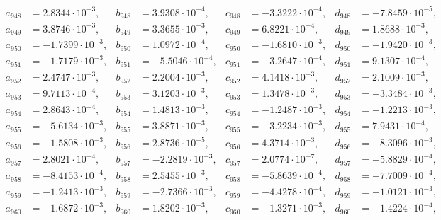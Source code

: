 \begin{align*}
  a_{ 948 } &= 2.8344 \cdot 10^{ -3 }, & b_{ 948 } &= 3.9308 \cdot 10^{ -4 }, & c_{ 948 } &= -3.3222 \cdot 10^{ -4 }, & d_{ 948 } &= -7.8459 \cdot 10^{ -5 }, \\ 
  a_{ 949 } &= 3.8746 \cdot 10^{ -3 }, & b_{ 949 } &= 3.3655 \cdot 10^{ -3 }, & c_{ 949 } &= 6.8221 \cdot 10^{ -4 }, & d_{ 949 } &= 1.8688 \cdot 10^{ -3 }, \\ 
  a_{ 950 } &= -1.7399 \cdot 10^{ -3 }, & b_{ 950 } &= 1.0972 \cdot 10^{ -4 }, & c_{ 950 } &= -1.6810 \cdot 10^{ -3 }, & d_{ 950 } &= -1.9420 \cdot 10^{ -3 }, \\ 
  a_{ 951 } &= -1.7179 \cdot 10^{ -3 }, & b_{ 951 } &= -5.5046 \cdot 10^{ -4 }, & c_{ 951 } &= -3.2647 \cdot 10^{ -4 }, & d_{ 951 } &= 9.1307 \cdot 10^{ -4 }, \\ 
  a_{ 952 } &= 2.4747 \cdot 10^{ -3 }, & b_{ 952 } &= 2.2004 \cdot 10^{ -3 }, & c_{ 952 } &= 4.1418 \cdot 10^{ -3 }, & d_{ 952 } &= 2.1009 \cdot 10^{ -3 }, \\ 
  a_{ 953 } &= 9.7113 \cdot 10^{ -4 }, & b_{ 953 } &= 3.1203 \cdot 10^{ -3 }, & c_{ 953 } &= 1.3478 \cdot 10^{ -3 }, & d_{ 953 } &= -3.3484 \cdot 10^{ -3 }, \\ 
  a_{ 954 } &= 2.8643 \cdot 10^{ -4 }, & b_{ 954 } &= 1.4813 \cdot 10^{ -3 }, & c_{ 954 } &= -1.2487 \cdot 10^{ -3 }, & d_{ 954 } &= -1.2213 \cdot 10^{ -3 }, \\ 
  a_{ 955 } &= -5.6134 \cdot 10^{ -3 }, & b_{ 955 } &= 3.8871 \cdot 10^{ -3 }, & c_{ 955 } &= -3.2234 \cdot 10^{ -3 }, & d_{ 955 } &= 7.9431 \cdot 10^{ -4 }, \\ 
  a_{ 956 } &= -1.5808 \cdot 10^{ -3 }, & b_{ 956 } &= 2.8736 \cdot 10^{ -5 }, & c_{ 956 } &= 4.3714 \cdot 10^{ -3 }, & d_{ 956 } &= -8.3096 \cdot 10^{ -3 }, \\ 
  a_{ 957 } &= 2.8021 \cdot 10^{ -4 }, & b_{ 957 } &= -2.2819 \cdot 10^{ -3 }, & c_{ 957 } &= 2.0774 \cdot 10^{ -7 }, & d_{ 957 } &= -5.8829 \cdot 10^{ -4 }, \\ 
  a_{ 958 } &= -8.4153 \cdot 10^{ -4 }, & b_{ 958 } &= 2.5455 \cdot 10^{ -3 }, & c_{ 958 } &= -5.8639 \cdot 10^{ -4 }, & d_{ 958 } &= -7.7009 \cdot 10^{ -4 }, \\ 
  a_{ 959 } &= -1.2413 \cdot 10^{ -3 }, & b_{ 959 } &= -2.7366 \cdot 10^{ -3 }, & c_{ 959 } &= -4.4278 \cdot 10^{ -4 }, & d_{ 959 } &= -1.0121 \cdot 10^{ -3 }, \\ 
  a_{ 960 } &= -1.6872 \cdot 10^{ -3 }, & b_{ 960 } &= 1.8202 \cdot 10^{ -3 }, & c_{ 960 } &= -1.3271 \cdot 10^{ -3 }, & d_{ 960 } &= -1.4224 \cdot 10^{ -4 }, \\ 

\end{align*}
